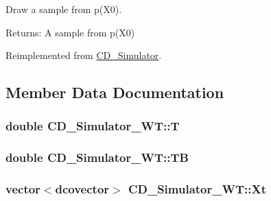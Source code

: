 Draw a sample from p(X0). 

\begin{Desc}
\item[Returns:]A sample from p(X0) \end{Desc}


Reimplemented from \hyperlink{class_c_d___simulator_cbdbea3e487026be0c032d2218d27b2b}{CD\_\-Simulator}.

\subsection{Member Data Documentation}
\hypertarget{class_c_d___simulator___w_t_f6bede78aad1b7d023d5b139172a4103}{
\subsubsection[{T}]{\setlength{\rightskip}{0pt plus 5cm}double {\bf CD\_\-Simulator\_\-WT::T}}}
\label{class_c_d___simulator___w_t_f6bede78aad1b7d023d5b139172a4103}


\hypertarget{class_c_d___simulator___w_t_5683b0d07bcb3f4f990ae261bb372487}{
\subsubsection[{TB}]{\setlength{\rightskip}{0pt plus 5cm}double {\bf CD\_\-Simulator\_\-WT::TB}}}
\label{class_c_d___simulator___w_t_5683b0d07bcb3f4f990ae261bb372487}


\hypertarget{class_c_d___simulator___w_t_eec47eb023c17590e9d1d89af874f1bc}{
\subsubsection[{Xt}]{\setlength{\rightskip}{0pt plus 5cm}vector$<$dcovector$>$ {\bf CD\_\-Simulator\_\-WT::Xt}}}
\label{class_c_d___simulator___w_t_eec47eb023c17590e9d1d89af874f1bc}


